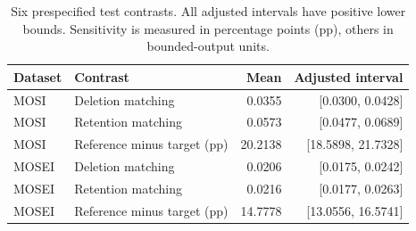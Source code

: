 \begin{table}[!htbp]\centering\small
\caption{Six prespecified test contrasts. All adjusted intervals have positive lower bounds. Sensitivity is measured in percentage points (pp), others in bounded-output units.}\label{tab:test-primary}
\begin{tabular}{llrr}\toprule Dataset & Contrast & Mean & Adjusted interval \\\midrule
MOSI & Deletion matching & 0.0355 & [0.0300, 0.0428] \\
MOSI & Retention matching & 0.0573 & [0.0477, 0.0689] \\
MOSI & Reference minus target (pp) & 20.2138 & [18.5898, 21.7328] \\
MOSEI & Deletion matching & 0.0206 & [0.0175, 0.0242] \\
MOSEI & Retention matching & 0.0216 & [0.0177, 0.0263] \\
MOSEI & Reference minus target (pp) & 14.7778 & [13.0556, 16.5741] \\
\bottomrule\end{tabular}\end{table}